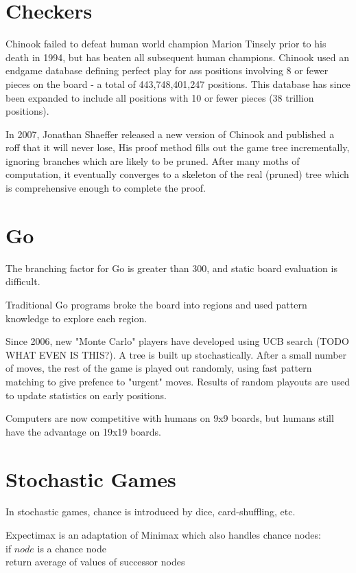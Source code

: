 \section{Checkers}
Chinook failed to defeat human world champion Marion Tinsely prior to his death
in 1994, but has beaten all subsequent human champions. Chinook used an endgame
database defining perfect play for ass positions involving 8 or fewer pieces on
the board - a total of 443,748,401,247 positions. This database has since been
expanded to include all positions with 10 or fewer pieces (38 trillion
positions).

In 2007, Jonathan Shaeffer released a new version of Chinook and published a
roff that it will never lose, His proof method fills out the game tree
incrementally, ignoring branches which are likely to be pruned. After many
moths of computation, it eventually converges to a skeleton of the real
(pruned) tree which is comprehensive enough to complete the proof.

\section{Go}
The branching factor for Go is greater than 300, and static board evaluation is
difficult.

Traditional Go programs broke the board into regions and used pattern knowledge
to explore each region.

Since 2006, new "Monte Carlo" players have developed using UCB search (TODO WHAT
EVEN IS THIS?). A tree is built up stochastically. After a small number of
moves, the rest of the game is played out randomly, using fast pattern matching
to give prefence to "urgent" moves. Results of random playouts are used to
update statistics on early positions.

Computers are now competitive with humans on 9x9 boards, but humans still have
the advantage on 19x19 boards.

\section{Stochastic Games}
In stochastic games, chance is introduced by dice, card-shuffling, etc.

Expectimax is an adaptation of Minimax which also handles chance nodes:\\
\indent if $node$ is a chance node\\
\indent\indent return average of values of successor nodes

